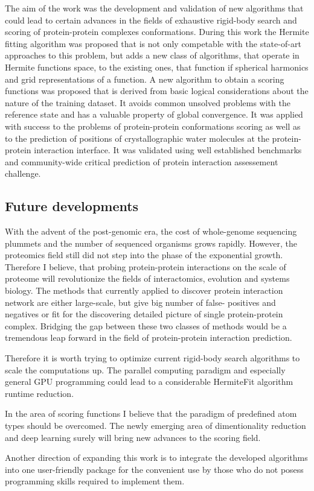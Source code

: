 The aim of the work was the development and validation of new algorithms that could lead to certain advances in the fields of exhaustive rigid-body search
and scoring of protein-protein complexes conformations. During this work the Hermite fitting algorithm was proposed that is not only competable with
the state-of-art approaches to this problem, but adds a new class of algorithms, that operate in Hermite functions space, to the existing ones, that 
function if spherical harmonics and grid representations of a function. A new algorithm to obtain a scoring functions was proposed that 
is derived from basic logical considerations about the nature of the training dataset. It avoids common unsolved problems with the reference state
and has a valuable property of global convergence. It was applied with success to the problems of protein-protein conformations scoring as well 
as to the prediction of positions of crystallographic water molecules at the protein-protein interaction interface. It was validated using 
well established benchmarks and community-wide critical prediction of protein interaction assessement challenge.

\subsection{Future developments}
With the advent of the post-genomic era, the cost of whole-genome sequencing plummets and the number of sequenced organisms grows rapidly. However,
the proteomics field still did not step into the phase of the exponential growth. Therefore I believe, that probing protein-protein interactions 
on the scale of proteome will revolutionize the fields of interactomics, evolution and systems biology. The methods that currently applied to 
discover protein interaction network are either large-scale, but give big number of false- positives and negatives or fit for the discovering 
detailed picture of single protein-protein complex. Bridging the gap between these two classes of methods would be a tremendous leap forward 
in the field of protein-protein interaction prediction.

Therefore it is worth trying to optimize current rigid-body search algorithms to scale the computations up. The parallel computing paradigm and
especially general GPU programming could lead to a considerable HermiteFit algorithm runtime reduction.

In the area of scoring functions I believe that the paradigm of predefined atom types should be overcomed. The newly emerging area of dimentionality
reduction and deep learning surely will bring new advances to the scoring field.

Another direction of expanding this work is to integrate the developed algorithms into one user-friendly package for the convenient use by those who do not
posess programming skills required to implement them.